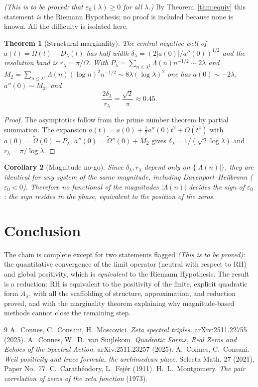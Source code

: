 \documentclass[11pt]{amsart}
\newtheorem{theorem}{Theorem}[section]
\newtheorem{corollary}[theorem]{Corollary}
\theoremstyle{definition}
\theoremstyle{remark}
\newcommand{\Om}{\widetilde\Omega}
\newcommand{\ve}{\varepsilon}
\begin{document}
\noindent\emph{(This is to be proved: that $\ve_0(\lambda)\ge0$ for all $\lambda$.)} By
Theorem~\ref{thm:equiv} this statement \emph{is} the Riemann Hypothesis; no proof is included
because none is known. All the difficulty is isolated here.

\begin{theorem}[Structural marginality]
The central negative well of $a(t)=\Om(t)-D_\lambda(t)$ has half-width
$\delta_\lambda=(2|a(0)|/a''(0))^{1/2}$ and the resolution band is $r_\lambda=\pi/\Omega$. With
$P_\lambda=\sum_{n\le\lambda^2}\Lambda(n)n^{-1/2}\sim2\lambda$ and
$M_2=\sum_{n\le\lambda^2}\Lambda(n)(\log n)^2n^{-1/2}\sim8\lambda(\log\lambda)^2$ one has
$a(0)\sim-2\lambda$, $a''(0)\sim M_2$, and
\[
\frac{2\delta_\lambda}{r_\lambda}=\frac{\sqrt2}{\pi}\approx0.45.
\]
\end{theorem}
\begin{proof}
The asymptotics follow from the prime number theorem by partial summation. The expansion
$a(t)=a(0)+\tfrac12a''(0)t^2+O(t^4)$ with $a(0)=\Om(0)-P_\lambda$, $a''(0)=\Om''(0)+M_2$ gives
$\delta_\lambda=1/(\sqrt2\log\lambda)$ and $r_\lambda=\pi/\log\lambda$.
\end{proof}

\begin{corollary}[Magnitude no-go]
Since $\delta_\lambda,r_\lambda$ depend only on $\{|\Lambda(n)|\}$, they are identical for
any system of the same magnitude, including Davenport--Heilbronn ($\ve_0<0$). Therefore
no functional of the magnitudes $|\Lambda(n)|$ decides the sign of $\ve_0$: the sign resides in
the phase, equivalent to the position of the zeros.
\end{corollary}

\section{Conclusion}
The chain is complete except for two statements flagged \emph{(This is to be proved)}: the
quantitative convergence of the limit operator (neutral with respect to RH) and global
positivity, which is \emph{equivalent} to the Riemann Hypothesis. The result is a reduction: RH
is equivalent to the positivity of the finite, explicit quadratic form $A_\lambda$, with all the
scaffolding of structure, approximation, and reduction proved, and with the marginality theorem
explaining why magnitude-based methods cannot close the remaining step.

\begin{thebibliography}{9}
 A.~Connes, C.~Consani, H.~Moscovici. \emph{Zeta spectral triples.}
arXiv:2511.22755 (2025).
 A.~Connes, W.~D.~van Suijlekom. \emph{Quadratic Forms, Real Zeros and Echoes of
the Spectral Action.} arXiv:2511.23257 (2025).
 A.~Connes, C.~Consani. \emph{Weil positivity and trace formula, the archimedean
place.} Selecta Math. 27 (2021), Paper No.~77.
 C.~Carathéodory, L.~Fejér (1911).
 H.~L.~Montgomery. \emph{The pair correlation of zeros of the zeta function}
(1973).
\end{thebibliography}
\end{document}
